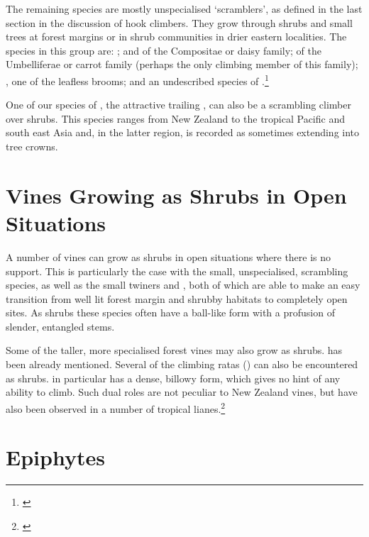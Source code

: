 The remaining species are mostly unspecialised `scramblers', as defined in the last section in the discussion of hook climbers.
They grow through shrubs and small trees at forest margins or in shrub communities in drier eastern localities.
The species in this group are: ;  and  of the Compositae or daisy family;  of the Umbelliferae or carrot family (perhaps the only climbing member of this family); , one of the leafless brooms; and an undescribed species of .\footnote{\cite{eagle1982trees}}

One of our species of , the attractive trailing , can also be a scrambling climber over shrubs.
This species ranges from New Zealand to the tropical Pacific and south east Asia and, in the latter region, is recorded as sometimes extending into tree crowns.

\section{Vines Growing as Shrubs in Open Situations}

A number of vines can grow as shrubs in open situations where there is no support.
This is particularly the case with the small, unspecialised, scrambling species, as well as the small twiners  and , both of which are able to make an easy transition from well lit forest margin and shrubby habitats to completely open sites.
As shrubs these species often have a ball-like form with a profusion of slender, entangled stems.

Some of the taller, more specialised forest vines may also grow as shrubs.  has been already mentioned.
Several of the climbing ratas () can also be encountered as shrubs.  in particular has a dense, billowy form, which gives no hint of any ability to climb.
Such dual roles are not peculiar to New Zealand vines, but have also been observed in a number of tropical lianes.\footnote{\cite{richards1952tropical}}

\section{Epiphytes}

